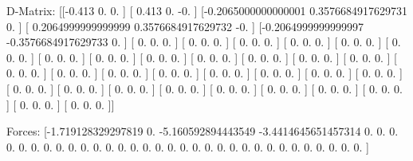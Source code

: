 D-Matrix:
[[-0.413               0.                  0.                ]
 [ 0.413               0.                 -0.                ]
 [-0.2065000000000001  0.3576684917629731  0.                ]
 [ 0.2064999999999999  0.3576684917629732 -0.                ]
 [-0.2064999999999997 -0.3576684917629733  0.                ]
 [ 0.                  0.                  0.                ]
 [ 0.                  0.                  0.                ]
 [ 0.                  0.                  0.                ]
 [ 0.                  0.                  0.                ]
 [ 0.                  0.                  0.                ]
 [ 0.                  0.                  0.                ]
 [ 0.                  0.                  0.                ]
 [ 0.                  0.                  0.                ]
 [ 0.                  0.                  0.                ]
 [ 0.                  0.                  0.                ]
 [ 0.                  0.                  0.                ]
 [ 0.                  0.                  0.                ]
 [ 0.                  0.                  0.                ]
 [ 0.                  0.                  0.                ]
 [ 0.                  0.                  0.                ]
 [ 0.                  0.                  0.                ]
 [ 0.                  0.                  0.                ]
 [ 0.                  0.                  0.                ]
 [ 0.                  0.                  0.                ]
 [ 0.                  0.                  0.                ]
 [ 0.                  0.                  0.                ]
 [ 0.                  0.                  0.                ]
 [ 0.                  0.                  0.                ]
 [ 0.                  0.                  0.                ]
 [ 0.                  0.                  0.                ]
 [ 0.                  0.                  0.                ]
 [ 0.                  0.                  0.                ]
 [ 0.                  0.                  0.                ]
 [ 0.                  0.                  0.                ]
 [ 0.                  0.                  0.                ]
 [ 0.                  0.                  0.                ]]

Forces:
[-1.719128329297819   0.                 -5.160592894443549
 -3.4414645651457314  0.                  0.
  0.                  0.                  0.
  0.                  0.                  0.
  0.                  0.                  0.
  0.                  0.                  0.
  0.                  0.                  0.
  0.                  0.                  0.
  0.                  0.                  0.
  0.                  0.                  0.
  0.                  0.                  0.
  0.                  0.                  0.                ]

